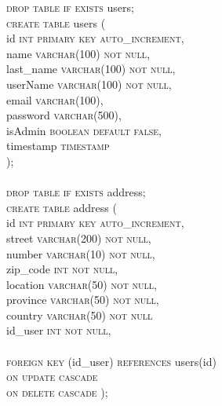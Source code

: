 \documentclass{article}
\begin{document}
\textsc{\textcolor{sentence}{drop table if exists}} users;\\
\textsc{\textcolor{sentence}{create table}} users (\\
\phantom{abc} id \textsc{\textcolor{sentence}{int primary key auto\_increment}},\\
\phantom{abc} name \textsc{\textcolor{sentence}{varchar\textcolor{numberSQL}{(100)} not null}},\\
\phantom{abc} last\_name \textsc{\textcolor{sentence}{varchar\textcolor{numberSQL}{(100)} not null}},\\
\phantom{abc} userName \textsc{\textcolor{sentence}{varchar\textcolor{numberSQL}{(100)} not null}},\\
\phantom{abc} email \textsc{\textcolor{sentence}{varchar\textcolor{numberSQL}{(100)}}},\\
\phantom{abc} password \textsc{\textcolor{sentence}{varchar\textcolor{numberSQL}{(500)}}},\\
\phantom{abc} isAdmin \textsc{\textcolor{sentence}{boolean default false}},\\
\phantom{abc} timestamp \textsc{\textcolor{sentence}{timestamp}}\\
);\\\\

\textsc{\textcolor{sentence}{drop table if exists}} address;\\
 \textsc{\textcolor{sentence}{create table}} address (\\
  \phantom{abc} id \textsc{\textcolor{sentence}{int primary key auto\_increment}},\\
   \phantom{abc} street \textsc{\textcolor{sentence}{varchar\textcolor{numberSQL}{(200)}  not null}},\\
   \phantom{abc} number \textsc{\textcolor{sentence}{varchar\textcolor{numberSQL}{(10)}  not null}},\\
   \phantom{abc} zip\_code \textsc{\textcolor{sentence}{int not null}},\\
   \phantom{abc} location \textsc{\textcolor{sentence}{varchar\textcolor{numberSQL}{(50)} not null}},\\
   \phantom{abc} province \textsc{\textcolor{sentence}{varchar\textcolor{numberSQL}{(50)} not null}},\\
   \phantom{abc} country \textsc{\textcolor{sentence}{varchar\textcolor{numberSQL}{(50)} not null}}\\
   \phantom{abc} id\_user \textsc{\textcolor{sentence}{int not null}},\\\\
\phantom{abc} \textsc{\textcolor{sentence}{foreign key}} (id\_user) \textsc{\textcolor{sentence}{references}} users(id)\\
\phantom{abc} \textsc{\textcolor{sentence}{on update cascade}}\\
\phantom{abc} \textsc{\textcolor{sentence}{on delete  cascade}}
   );
\end{document}
